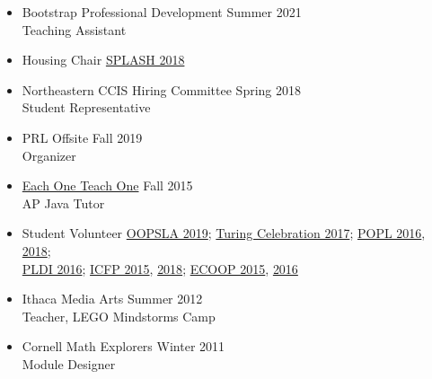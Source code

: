 \documentclass[11pt]{article}
\begin{document}
\begin{itemize}
  \item {Bootstrap Professional Development} \hfill {Summer 2021}\\
        Teaching Assistant
  \item {Housing Chair} \hfill \href{https://2018.splashcon.org/committee/splash-2018-organizing-committee}{SPLASH 2018}
  \item {Northeastern CCIS Hiring Committee} \hfill {Spring 2018}\\
    Student Representative
  \item {PRL Offsite} \hfill {Fall 2019}\\
    Organizer
  \item \href{https://www.eachoneteachone.is}{Each One Teach One} \hfill {Fall 2015}\\
    AP Java Tutor
  \item {Student Volunteer} \hfill \href{https://2019.splashcon.org/}{OOPSLA 2019}; \href{https://www.acm.org/turing-award-50/conference}{Turing Celebration 2017}; \href{http://conf.researchr.org/home/POPL-2016}{POPL 2016}, \href{http://conf.researchr.org/home/POPL-2018}{2018};\\
    {\hbox{}\hfill{} \href{http://conf.researchr.org/home/PLDI-2016}{PLDI 2016}; \href{http://icfpconference.org/icfp2015/}{ICFP 2015}, \href{https://icfp18.sigplan.org/committee/icfp-2018-organizing-committee}{2018}; \href{http://2015.ecoop.org/}{ECOOP 2015}, \href{http://2016.ecoop.org/}{2016}}
  \item {Ithaca Media Arts} \hfill {Summer 2012}\\
    Teacher, LEGO Mindstorms Camp
  \item {Cornell Math Explorers} \hfill {Winter 2011}\\
    Module Designer

\end{itemize}
\end{document}
